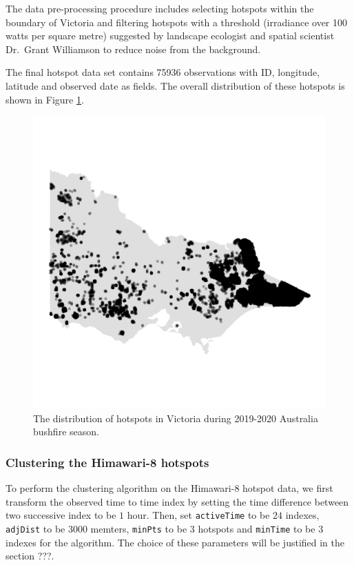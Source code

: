 The data pre-processing procedure includes selecting hotspots within the
boundary of Victoria and filtering hotspots with a threshold (irradiance
over 100 watts per square metre) suggested by landscape ecologist and
spatial scientist Dr.~Grant Williamson \citeyearpar{hotspots} to reduce
noise from the background.

The final hotspot data set contains 75936 observations with ID,
longitude, latitude and observed date as fields. The overall
distribution of these hotspots is shown in Figure \ref{fig:hotspots}.

\begin{Schunk}
\begin{figure}

{\centering \includegraphics[width=0.8\linewidth]{figures/before_clustering} 

}

\caption[The distribution of hotspots in Victoria during 2019-2020 Australia bushfire season]{The distribution of hotspots in Victoria during 2019-2020 Australia bushfire season.}\label{fig:hotspots}
\end{figure}
\end{Schunk}

\hypertarget{clustering-the-himawari-8-hotspots}{%
\subsubsection{Clustering the Himawari-8
hotspots}\label{clustering-the-himawari-8-hotspots}}

To perform the clustering algorithm on the Himawari-8 hotspot data, we
first transform the observed time to time index by setting the time
difference between two successive index to be \(1\) hour. Then, set
\texttt{activeTime} to be \(24\) indexes, \texttt{adjDist} to be
\(3000\) memters, \texttt{minPts} to be \(3\) hotspots and
\texttt{minTime} to be \(3\) indexes for the algorithm. The choice of
these parameters will be justified in the section ???.

